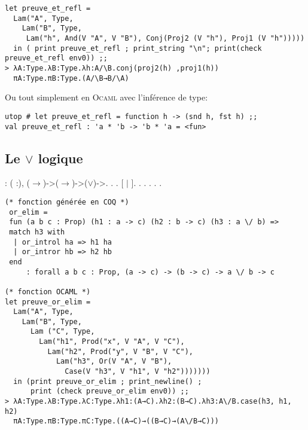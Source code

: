 \begin{Verbatim}
let preuve_et_refl = 
  Lam("A", Type,
    Lam("B", Type, 
     Lam("h", And(V "A", V "B"), Conj(Proj2 (V "h"), Proj1 (V "h"))))) 
  in ( print preuve_et_refl ; print_string "\n"; print(check preuve_et_refl env0)) ;;
> λA:Type.λB:Type.λh:A/\B.conj(proj2(h) ,proj1(h))
  πA:Type.πB:Type.(A/\B→B/\A)
\end{Verbatim}
Ou tout simplement en \textsc{Ocaml} avec l'inférence de type:
\begin{Verbatim}
utop # let preuve_et_refl = function h -> (snd h, fst h) ;;
val preuve_et_refl : 'a * 'b -> 'b * 'a = <fun>
\end{Verbatim}

\subsection{Le $\lor$ logique}

\begin{coqdoccode}
\coqdocnoindent
{} : \coqdockw{\ensuremath{\forall}} (  :), (\ensuremath{\rightarrow})->(\ensuremath{\rightarrow})->(\ensuremath{\lor})->.\coqdoceol
\coqdocnoindent
{}.\coqdoceol
\coqdocindent{1.00em}
      .\coqdoceol
\coqdocindent{1.00em}
   [ \ensuremath{|} ].\coqdoceol
\coqdocindent{1.00em}
 .  .\coqdoceol
\coqdocindent{1.00em}
 .  .\coqdoceol
\coqdocnoindent
{}.\coqdoceol
\end{coqdoccode}
\begin{Verbatim}
(* fonction générée en COQ *)
 or_elim = 
 fun (a b c : Prop) (h1 : a -> c) (h2 : b -> c) (h3 : a \/ b) =>
 match h3 with
  | or_introl ha => h1 ha
  | or_intror hb => h2 hb
 end
     : forall a b c : Prop, (a -> c) -> (b -> c) -> a \/ b -> c  

(* fonction OCAML *)
let preuve_or_elim =
  Lam("A", Type,
    Lam("B", Type,
      Lam ("C", Type,
        Lam("h1", Prod("x", V "A", V "C"),
          Lam("h2", Prod("y", V "B", V "C"),
            Lam("h3", Or(V "A", V "B"), 
              Case(V "h3", V "h1", V "h2"))))))) 
  in (print preuve_or_elim ; print_newline() ;
      print (check preuve_or_elim env0)) ;;
> λA:Type.λB:Type.λC:Type.λh1:(A→C).λh2:(B→C).λh3:A\/B.case(h3, h1, h2)
  πA:Type.πB:Type.πC:Type.((A→C)→((B→C)→(A\/B→C)))
\end{Verbatim}

